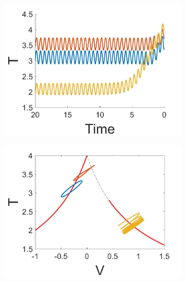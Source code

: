\begin{figure}[H]
\centering
\begin{subfigure}{.5\textwidth}
 \centering
 \includegraphics[width=\linewidth]{twoD/osc_Ttimeseries.jpg}
 \caption{}
\end{subfigure}%
\begin{subfigure}{.5\textwidth}
 \centering
 \includegraphics[width=\linewidth]{twoD/osc_bif_Tplot.jpg}
 \caption{}
\end{subfigure}
\begin{subfigure}{.5\textwidth}
 \centering

\end{subfigure}
\end{figure}
